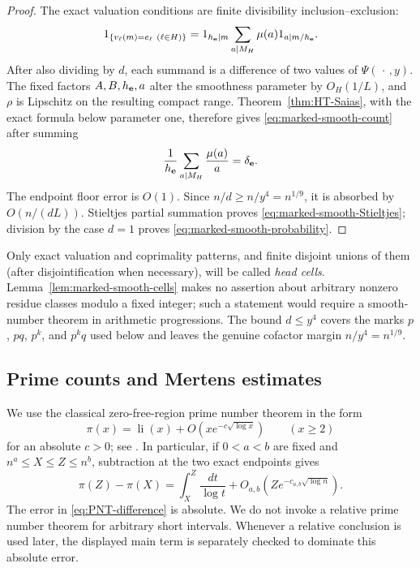 \documentclass[11pt]{article}
\numberwithin{equation}{section}
\theoremstyle{definition}
\theoremstyle{remark}
\newcommand{\1}{\mathbf 1}
\begin{document}
\begin{proof}
The exact valuation conditions are finite divisibility
inclusion--exclusion:
\[
 1_{\{v_\ell(m)=e_\ell\ (\ell\in H)\}}
 =1_{h_{\bf e}\mid m}
   \sum_{a\mid M_H}\mu(a)
       1_{a\mid m/h_{\bf e}}.
\]
After also dividing by \(d\), each summand is a difference of two values of
\(\Psi(\,\cdot\,,y)\).  The fixed factors \(A,B,h_{\bf e},a\) alter the
smoothness parameter by \(O_H(1/L)\), and \(\rho\) is Lipschitz on the
resulting compact range.  Theorem~\ref{thm:HT-Saias}, with the exact formula
below parameter one, therefore gives \eqref{eq:marked-smooth-count} after
summing
\[
       \frac1{h_{\bf e}}
       \sum_{a\mid M_H}\frac{\mu(a)}a
       =\delta_{\bf e}.
\]
The endpoint floor error is \(O(1)\).  Since
\(n/d\geq n/y^4=n^{1/9}\), it is absorbed by \(O(n/(dL))\).
Stieltjes partial summation proves
\eqref{eq:marked-smooth-Stieltjes}; division by the case \(d=1\) proves
\eqref{eq:marked-smooth-probability}.
\end{proof}

Only exact valuation and coprimality patterns, and finite disjoint unions
of them (after disjointification when necessary), will be called
\emph{head cells}.  Lemma~\ref{lem:marked-smooth-cells} makes
no assertion about arbitrary nonzero residue classes modulo a fixed integer;
such a statement would require a smooth-number theorem in arithmetic
progressions.  The bound \(d\leq y^4\) covers the marks \(p\), \(pq\),
\(p^k\), and \(p^kq\) used below and leaves the genuine cofactor margin
\(n/y^4=n^{1/9}\).

\subsection{Prime counts and Mertens estimates}
\label{subsec:pnt-mertens}

We use the classical zero-free-region prime number theorem in the form
\begin{equation}
 \label{eq:cumulative-PNT}
 \pi(x)=\operatorname{li}(x)
       +O\!\left(xe^{-c\sqrt{\log x}}\right)
       \qquad(x\geq2)
\end{equation}
for an absolute \(c>0\); see
\cite[Theorem~6.9]{MontgomeryVaughan2007}.  In particular, if
\(0<a<b\) are fixed and
\(n^a\leq X\leq Z\leq n^b\), subtraction at the two exact endpoints gives
\begin{equation}
 \label{eq:PNT-difference}
 \pi(Z)-\pi(X)
 =\int_X^Z\frac{dt}{\log t}
   +O_{a,b}\!\left(Ze^{-c_{a,b}\sqrt{\log n}}\right).
\end{equation}
The error in \eqref{eq:PNT-difference} is absolute.  We do not invoke a
relative prime number theorem for arbitrary short intervals.  Whenever a
relative conclusion is used later, the displayed main term is separately
checked to dominate this absolute error.
\end{document}
